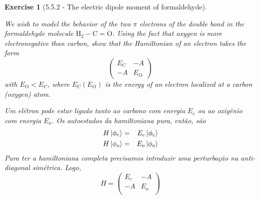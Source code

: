 \documentclass[12pt]{article}
\def\be{\begin{equation}}
\def\ee{\end{equation}}
\def\bea{\begin{eqnarray*}}
\def\eea{\end{eqnarray*}}
\newtheorem{exercise}{Exercise}
\begin{document}
	\begin{exercise}[5.5.2 - The electric dipole moment of formaldehyde]
		\begin{exercises}
			\item We wish to model the behavior of the two $\pi$ electrons of the double bond in the formaldehyde molecule $\mathrm{H}_{2}-\mathrm{C}=\mathrm{O}$. Using the fact that oxygen is more electronegative than carbon, show that the Hamiltonian of an electron takes the form
			$$
			\left(\begin{array}{cc}
				E_{\mathrm{C}} & -A \\
				-A & E_{\mathrm{O}}
			\end{array}\right)
			$$
			with $E_{\mathrm{O}}<E_{\mathrm{C}}$, where $E_{\mathrm{C}}\left(E_{\mathrm{O}}\right)$ is the energy of an electron localized at a carbon (oxygen) atom.
			\begin{multianswer}
				Um elétron pode estar ligado tanto ao carbono com energia $E_c$ ou ao oxigênio com energia $E_o$. Os autoestados da hamiltoniana pura, então, são
				\bea
					H\ket{\phi_e} &=& E_c\ket{\phi_c} \\
					H\ket{\phi_o} &=& E_o\ket{\phi_o} 
				\eea
				Para ter a hamiltoniana completa precisamos introduzir uma perturbação na anti-diagonal simétrica. Logo,
				\be
					H = 
					\begin{pmatrix}
						E_c & -A \\
						-A & E_o \\
					\end{pmatrix}
				\ee
			\end{multianswer}
		

\end{exercises}
\end{exercise}
\end{document}
